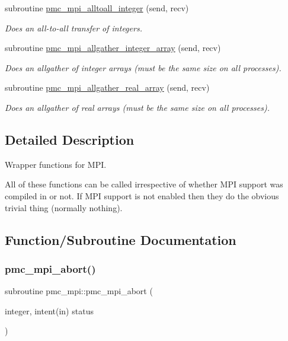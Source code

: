 \begin{DoxyCompactItemize}
subroutine \mbox{\hyperlink{namespacepmc__mpi_ac7882ff99a49670f3601c32959f517e1}{pmc\+\_\+mpi\+\_\+alltoall\+\_\+integer}} (send, recv)
\begin{DoxyCompactList}\small\item\em Does an all-\/to-\/all transfer of integers. \end{DoxyCompactList}\item 
subroutine \mbox{\hyperlink{namespacepmc__mpi_af79ceb854ff634f821a291c373810765}{pmc\+\_\+mpi\+\_\+allgather\+\_\+integer\+\_\+array}} (send, recv)
\begin{DoxyCompactList}\small\item\em Does an allgather of integer arrays (must be the same size on all processes). \end{DoxyCompactList}\item 
subroutine \mbox{\hyperlink{namespacepmc__mpi_a999792706377ad2876cbf470df97c26d}{pmc\+\_\+mpi\+\_\+allgather\+\_\+real\+\_\+array}} (send, recv)
\begin{DoxyCompactList}\small\item\em Does an allgather of real arrays (must be the same size on all processes). \end{DoxyCompactList}\end{DoxyCompactItemize}


\subsection{Detailed Description}
Wrapper functions for M\+PI. 

All of these functions can be called irrespective of whether M\+PI support was compiled in or not. If M\+PI support is not enabled then they do the obvious trivial thing (normally nothing). 

\subsection{Function/\+Subroutine Documentation}
\mbox{\label{namespacepmc__mpi_a9b929bc85dfded58ac602697ab95ef42}} 
\subsubsection{\texorpdfstring{pmc\+\_\+mpi\+\_\+abort()}{pmc\_mpi\_abort()}}
{\footnotesize\ttfamily subroutine pmc\+\_\+mpi\+::pmc\+\_\+mpi\+\_\+abort (\begin{DoxyParamCaption}\item[{integer, intent(in)}]{status }\end{DoxyParamCaption})}




